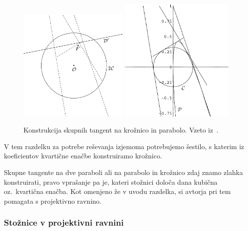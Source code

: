 \begin{figure}[h]
    \centering
    \includegraphics[width=0.48\textwidth]{images/tang_krozn_par1.png}
    \includegraphics[width=0.5\textwidth]{images/tang_krozn_par2.png}
    \caption[Skupna tangenta na krožnico in parabolo]{Konstrukcija skupnih tangent na krožnico in parabolo. Vzeto iz~\cite[str.\ 24--25]{edwards2001}.}
    \label{fig:tang_kroznica_par}
\end{figure}

\begin{opomba}
    V tem razdelku za potrebe reševanja izjemoma potrebujemo šestilo, s katerim iz koeficientov kvartične enačbe konstruiramo krožnico.
\end{opomba}

Skupne tangente na dve paraboli ali na parabolo in krožnico zdaj znamo zlahka konstruirati, pravo vprašanje pa je, kateri stožnici določa dana kubična oz.\ kvartična enačba. Kot omenjeno že v uvodu razdelka, si avtorja pri tem pomagata s projektivno ravnino. 

\subsubsection*{Stožnice v projektivni ravnini}
\label{podpogl:stoznice_projektivna}

